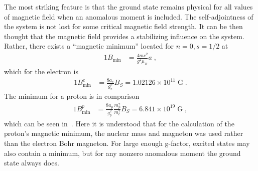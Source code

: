 The most striking feature is that the ground state remains physical for all values of magnetic field when an anomalous moment is included. The self-adjointness of the system is not lost for some critical magnetic field strength. It can be then thought that the magnetic field provides a stabilizing influence on the system. Rather, there exists a ``magnetic minimum'' located for $n=0, s=1/2$ at
\begin{alignat}{1}
\label{IKGP06} B_{\mathrm{min}}&=\frac{4mc^{2}}{g^{2}\mu_{B}}a\;,
\end{alignat}
which for the electron is
\begin{alignat}{1}
B_{\mathrm{min}}^{e}&=\frac{8a_e}{g_e^2}B_{S}
=1.02126\times10^{11}\;\mathrm{G}\;.
\end{alignat}
The minimum for a proton is in comparison
\begin{alignat}{1}
B_{\mathrm{min}}^{p}&=\frac{8a_p}{g_p^2} \frac{m_p^2}{m_e^2}B_{S}
=6.841\times10^{19}\;\mathrm{G}\;,
\end{alignat}
which can be seen in~. Here it is understood that for the calculation of the proton's magnetic minimum, the nuclear mass and magneton was used rather than the electron Bohr magneton. For large enough g-factor, excited states may also contain a minimum, but for any nonzero anomalous moment the ground state always does.

